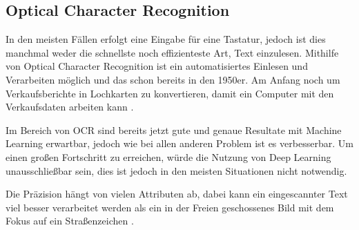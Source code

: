 \subsection{Optical Character Recognition}

In den meisten Fällen erfolgt eine Eingabe für eine Tastatur, jedoch ist dies manchmal weder die schnellste noch effizienteste Art, Text einzulesen. Mithilfe von Optical Character Recognition ist ein automatisiertes Einlesen und Verarbeiten möglich und das schon bereits in den 1950er. Am Anfang noch um Verkaufsberichte in Lochkarten zu konvertieren, damit ein Computer mit den Verkaufsdaten arbeiten kann \cite{OCR:online}.

Im Bereich von OCR sind bereits jetzt gute und genaue Resultate mit Machine Learning erwartbar, jedoch wie bei allen anderen Problem ist es verbesserbar. Um einen großen Fortschritt zu erreichen, würde die Nutzung von Deep Learning unausschließbar sein, dies ist jedoch in den meisten Situationen nicht notwendig.

Die Präzision hängt von vielen Attributen ab, dabei kann ein eingescannter Text viel besser verarbeitet werden als ein in der Freien geschossenes Bild mit dem Fokus auf ein Straßenzeichen \cite{OCR2:online}. 


